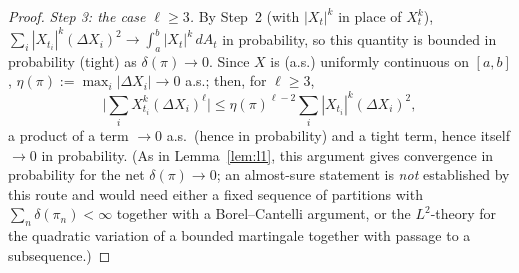 \documentclass[10pt,a4paper]{amsart}
\begin{document}
\begin{proof}
\medskip\noindent\textit{Step 3: the case $\ell\ge3$.} By Step~2 (with
$|X_t|^k$ in place of $X_t^k$), $\sum_i|X_{t_i}|^k(\Delta X_i)^2\to
\int_a^b|X_t|^k\,dA_t$ in probability, so this quantity is bounded in
probability (tight) as $\delta(\pi)\to0$. Since $X$ is (a.s.) uniformly
continuous on $[a,b]$, $\eta(\pi):=\max_i|\Delta X_i|\to0$ a.s.; then, for
$\ell\ge3$,
\[
\Big|\sum_iX_{t_i}^k(\Delta X_i)^\ell\Big|
\le\eta(\pi)^{\ell-2}\sum_i|X_{t_i}|^k(\Delta X_i)^2,
\]
a product of a term $\to0$ a.s.\ (hence in probability) and a tight term,
hence itself $\to0$ in probability. (As in Lemma~\ref{lem:l1}, this
argument gives convergence in probability for the net $\delta(\pi)\to0$;
an almost-sure statement is \emph{not} established by this route and
would need either a fixed sequence of partitions with
$\sum_n\delta(\pi_n)<\infty$ together with a Borel--Cantelli argument, or
the $L^2$-theory for the quadratic variation of a bounded martingale
together with passage to a subsequence.)
\end{proof}
\end{document}
